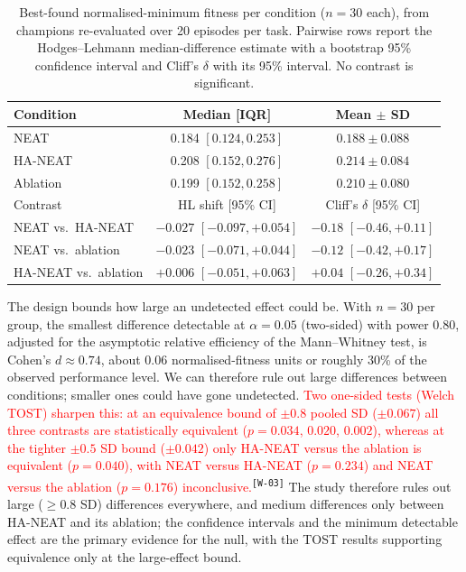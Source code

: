 \documentclass[12pt]{article}
\newcommand{\revID}[1]{\textsuperscript{\scriptsize\texttt{[#1]}}}
\newcommand{\revWrong}[2]{\textcolor{red}{#2}\revID{#1}}      %
\begin{document}
\begin{table}[h]
\centering
\caption{Best-found normalised-minimum fitness per condition ($n = 30$ each), from champions re-evaluated over 20 episodes per task. Pairwise rows report the Hodges--Lehmann median-difference estimate with a bootstrap 95\% confidence interval and Cliff's $\delta$ with its 95\% interval. No contrast is significant.}
\label{tab:main-fitness}
\begin{tabular}{lcc}
\toprule
Condition & Median [IQR] & Mean $\pm$ SD \\
\midrule
NEAT & 0.184 $[0.124, 0.253]$ & $0.188 \pm 0.088$ \\
HA-NEAT & 0.208 $[0.152, 0.276]$ & $0.214 \pm 0.084$ \\
Ablation & 0.199 $[0.152, 0.258]$ & $0.210 \pm 0.080$ \\
\midrule
Contrast & HL shift [95\% CI] & Cliff's $\delta$ [95\% CI] \\
\midrule
NEAT vs.\ HA-NEAT & $-0.027$ $[-0.097, +0.054]$ & $-0.18$ $[-0.46, +0.11]$ \\
NEAT vs.\ ablation & $-0.023$ $[-0.071, +0.044]$ & $-0.12$ $[-0.42, +0.17]$ \\
HA-NEAT vs.\ ablation & $+0.006$ $[-0.051, +0.063]$ & $+0.04$ $[-0.26, +0.34]$ \\
\bottomrule
\end{tabular}
\end{table}

The design bounds how large an undetected effect could be.
With $n = 30$ per group, the smallest difference detectable at $\alpha = 0.05$ (two-sided) with power 0.80, adjusted for the asymptotic relative efficiency of the Mann--Whitney test, is Cohen's $d \approx 0.74$, about 0.06 normalised-fitness units or roughly 30\% of the observed performance level.
We can therefore rule out large differences between conditions; smaller ones could have gone undetected.
\revWrong{W-03}{Two one-sided tests (Welch TOST) sharpen this: at an equivalence bound of $\pm 0.8$ pooled SD ($\pm 0.067$) all three contrasts are statistically equivalent ($p = 0.034$, $0.020$, $0.002$), whereas at the tighter $\pm 0.5$ SD bound ($\pm 0.042$) only HA-NEAT versus the ablation is equivalent ($p = 0.040$), with NEAT versus HA-NEAT ($p = 0.234$) and NEAT versus the ablation ($p = 0.176$) inconclusive.}
The study therefore rules out large ($\geq 0.8$ SD) differences everywhere, and medium differences only between HA-NEAT and its ablation; the confidence intervals and the minimum detectable effect are the primary evidence for the null, with the TOST results supporting equivalence only at the large-effect bound.
\end{document}
